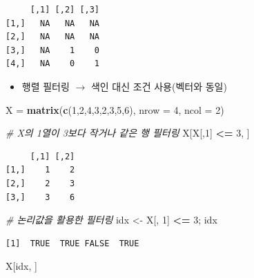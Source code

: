 \documentclass[
  11pt,
]{krantz}
\newenvironment{Shaded}{\begin{snugshade}}{\end{snugshade}}
\newcommand{\CommentTok}[1]{\textcolor[rgb]{0.37,0.37,0.37}{\textit{#1}}}
\newcommand{\DataTypeTok}[1]{\textcolor[rgb]{0.27,0.27,0.27}{#1}}
\newcommand{\DecValTok}[1]{\textcolor[rgb]{0.06,0.06,0.06}{#1}}
\newcommand{\KeywordTok}[1]{\textcolor[rgb]{0.27,0.27,0.27}{\textbf{#1}}}
\newcommand{\NormalTok}[1]{#1}
\newcommand{\OperatorTok}[1]{\textcolor[rgb]{0.43,0.43,0.43}{\textbf{#1}}}
\newcommand{\StringTok}[1]{\textcolor[rgb]{0.5,0.5,0.5}{#1}}
\providecommand{\tightlist}{%
  \setlength{\itemsep}{0pt}\setlength{\parskip}{0pt}}
\begin{document}
\begin{verbatim}
     [,1] [,2] [,3]
[1,]   NA   NA   NA
[2,]   NA   NA   NA
[3,]   NA    1    0
[4,]   NA    0    1
\end{verbatim}

\normalsize

\begin{itemize}
\tightlist
\item
  행렬 필터링 \(\rightarrow\) 색인 대신 조건 사용(벡터와 동일)
\end{itemize}

\footnotesize

\begin{Shaded}
\begin{Highlighting}[]
\NormalTok{X =}\StringTok{ }\KeywordTok{matrix}\NormalTok{(}\KeywordTok{c}\NormalTok{(}\DecValTok{1}\NormalTok{,}\DecValTok{2}\NormalTok{,}\DecValTok{4}\NormalTok{,}\DecValTok{3}\NormalTok{,}\DecValTok{2}\NormalTok{,}\DecValTok{3}\NormalTok{,}\DecValTok{5}\NormalTok{,}\DecValTok{6}\NormalTok{), }\DataTypeTok{nrow =} \DecValTok{4}\NormalTok{, }\DataTypeTok{ncol =} \DecValTok{2}\NormalTok{)}

\CommentTok{# X의 1열이 3보다 작거나 같은 행 필터링}
\NormalTok{X[X[,}\DecValTok{1}\NormalTok{] }\OperatorTok{<=}\StringTok{ }\DecValTok{3}\NormalTok{, ]}
\end{Highlighting}
\end{Shaded}

\begin{verbatim}
     [,1] [,2]
[1,]    1    2
[2,]    2    3
[3,]    3    6
\end{verbatim}

\begin{Shaded}
\begin{Highlighting}[]
\CommentTok{# 논리값을 활용한 필터링}
\NormalTok{idx <-}\StringTok{ }\NormalTok{X[, }\DecValTok{1}\NormalTok{] }\OperatorTok{<=}\StringTok{ }\DecValTok{3}\NormalTok{; idx}
\end{Highlighting}
\end{Shaded}

\begin{verbatim}
[1]  TRUE  TRUE FALSE  TRUE
\end{verbatim}

\begin{Shaded}
\begin{Highlighting}[]
\NormalTok{X[idx, ]}
\end{Highlighting}
\end{Shaded}
\end{document}
